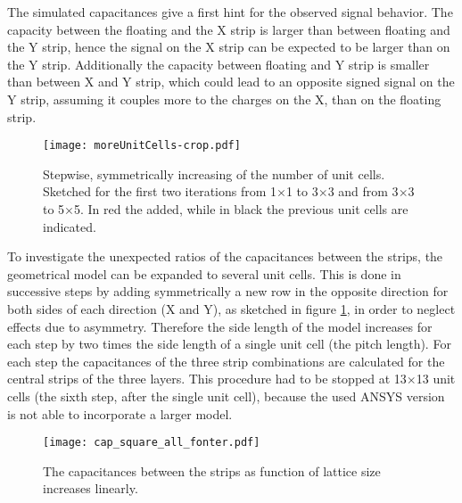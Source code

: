 \documentclass[
a4paper,                                %
twoside,                                %
BCOR1.4cm,                      %
10pt,                           %
headings=normal,                %
headsepline,                    %
clearplainpage, %
final,                                  %
div=14,
parskip=full,
openright,
bibliography=toc
]{scrreprt}
\begin{document}
The simulated capacitances give a first hint for the observed signal behavior. The capacity between the floating and the X strip is larger than between floating and the Y strip, hence the signal on the X strip can be expected to be larger than on the Y strip. Additionally the capacity between floating and Y strip is smaller than between X and Y strip, which could lead to an opposite signed signal on the Y strip, assuming it couples more to the charges on the X, than on the floating strip. 

\begin{figure}[H]
	\centering
	\texttt{[image: moreUnitCells-crop.pdf]}
	\caption{Stepwise, symmetrically increasing of the number of unit cells. Sketched for the first two iterations from 1$\times$1 to 3$\times$3 and from 3$\times$3 to 5$\times$5. In red the added, while in black the previous unit cells are indicated.}
	\label{moreUnitCells}
\end{figure}

To investigate the unexpected ratios of the capacitances between the strips, the geometrical model can be expanded to several unit cells. This is done in successive steps by adding symmetrically a new row in the opposite direction for both sides of each direction (X and Y), as sketched in figure \ref{moreUnitCells}, in order to neglect effects due to asymmetry. Therefore the side length of the model increases for each step by two times the side length of a single unit cell (the pitch length). For each step the capacitances of the three strip combinations are calculated for the central strips of the three layers. This procedure had to be stopped at 13$\times$13 unit cells (the sixth step, after the single unit cell), because the used ANSYS version is not able to incorporate a larger model.

\begin{figure}[H]	
	\centering
	\texttt{[image: cap\_square\_all\_fonter.pdf]}
	\caption{The capacitances between the strips as function of lattice size increases linearly.}
	\label{capa}
\end{figure}
\end{document}
